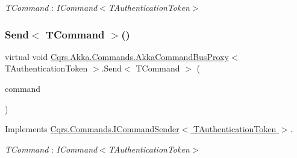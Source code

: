 \begin{Desc}
\item[Type Constraints]\begin{description}
\item[{\em T\+Command} : {\em I\+Command$<$T\+Authentication\+Token$>$}]\end{description}
\end{Desc}
\mbox{\label{classCqrs_1_1Akka_1_1Commands_1_1AkkaCommandBusProxy_a15945f41b7439e722f5608f48b63c6d9_a15945f41b7439e722f5608f48b63c6d9}} 
\subsubsection{\texorpdfstring{Send$<$ T\+Command $>$()}{Send< TCommand >()}\hspace{0.1cm}{\footnotesize\ttfamily [1/2]}}
{\footnotesize\ttfamily virtual void \hyperlink{classCqrs_1_1Akka_1_1Commands_1_1AkkaCommandBusProxy}{Cqrs.\+Akka.\+Commands.\+Akka\+Command\+Bus\+Proxy}$<$ T\+Authentication\+Token $>$.Send$<$ T\+Command $>$ (\begin{DoxyParamCaption}\item[{T\+Command}]{command }\end{DoxyParamCaption})\hspace{0.3cm}{\ttfamily [virtual]}}



Implements \hyperlink{interfaceCqrs_1_1Commands_1_1ICommandSender_a551d69f8679399fc0ce0fd99dead507a_a551d69f8679399fc0ce0fd99dead507a}{Cqrs.\+Commands.\+I\+Command\+Sender$<$ T\+Authentication\+Token $>$}.

\begin{Desc}
\item[Type Constraints]\begin{description}
\item[{\em T\+Command} : {\em I\+Command$<$T\+Authentication\+Token$>$}]\end{description}
\end{Desc}
\mbox{\label{classCqrs_1_1Akka_1_1Commands_1_1AkkaCommandBusProxy_a30115e2f8c964967aa8fe94712ece7c2_a30115e2f8c964967aa8fe94712ece7c2}} 
